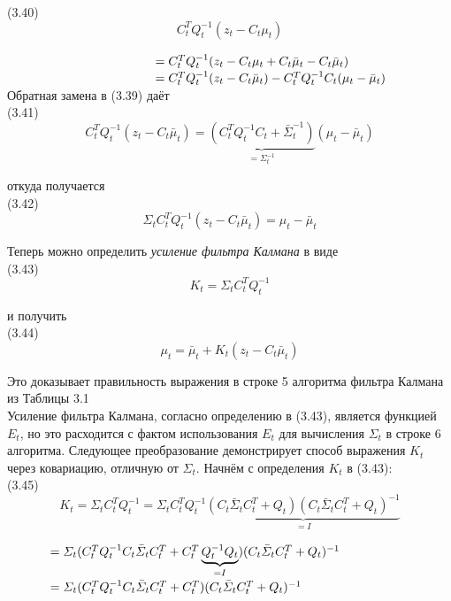 \documentclass[10pt,a4paper]{article}
\begin{document}
(3.40)
$$C_t^T Q_t^{-1}(z_t-C_t\mu_t)$$

$\hspace{42mm}=C_t^T Q_t^{-1}(z_t-C_t\mu_t+C_t\bar{\mu}_t-C_t\bar{\mu}_t)$\\

$\hspace{42mm}=C_t^T Q_t^{-1}(z_t-C_t\bar{\mu}_t)-C_t^T Q_t^{-1}C_t(\mu_t-\bar{\mu}_t)$\\

Обратная замена в (3.39) даёт\\

(3.41)
$$C_t^T Q_t^{-1}(z_t-C_t\bar{\mu}_t)=\underbrace{(C_t^T Q_t^{-1}C_t+\bar{\varSigma}_t^{-1})}_{=\varSigma_t^{-1}}(\mu_t-\bar{\mu}_t)$$

откуда получается\\

(3.42)
$$\varSigma_t C_t^T Q_t^{-1}(z_t-C_t\bar{\mu}_t)=\mu_t-\bar{\mu}_t$$

Теперь можно определить \textit{усиление фильтра Калмана} в виде\\

(3.43)
$$K_t=\varSigma_t C_t^T Q_t^{-1}$$

и получить\\

(3.44)
$$\mu_t=\bar{\mu}_t+K_t(z_t-C_t\bar{\mu}_t)$$

Это доказывает правильность выражения в строке 5 алгоритма фильтра Калмана из Таблицы 3.1\\

Усиление фильтра Калмана, согласно определению в (3.43), является функцией $E_t$, но это расходится с фактом использования $E_t$ для вычисления $\varSigma_t$ в строке 6 алгоритма. Следующее преобразование демонстрирует способ выражения $K_t$ через ковариацию, отличную от $\varSigma_t$. Начнём с определения $K_t$ в (3.43):\\

(3.45)
$$K_t=\varSigma_t C_t^T Q_t^{-1}=\varSigma_t C_t^T Q_t^{-1}\underbrace{(C_t\bar{\varSigma}_t C_t^T+Q_t)(C_t\bar{\varSigma}_t C_t^T+Q_t)^{-1}}_{=I}$$

$\hspace{12mm}=\varSigma_t (C_t^T Q_t^{-1}C_t\bar{\varSigma}_t C_t^T+C_t^T\underbrace{Q_t^{-1}Q_t}_{=I})(C_t\bar{\varSigma}_t C_t^T+Q_t)^{-1}$\\

$\hspace{12mm}=\varSigma_t (C_t^T Q_t^{-1}C_t\bar{\varSigma}_t C_t^T+C_t^T)(C_t\bar{\varSigma}_t C_t^T+Q_t)^{-1}$\\
\end{document}
